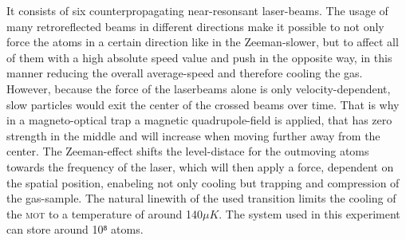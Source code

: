 It consists of six counterpropagating near-resonsant laser-beams. The usage of many retroreflected beams in different directions make it possible to not only force the atoms in a certain direction like in the Zeeman-slower, but to affect all of them with a high absolute speed value and push in the opposite way, in this manner reducing the overall average-speed and therefore cooling the gas. However, because the force of the laserbeams alone is only velocity-dependent, slow particles would exit the center of the crossed beams over time. That is why in a magneto-optical trap a magnetic quadrupole-field is applied, that has zero strength in the middle and will increase when moving further away from the center. The Zeeman-effect shifts the level-distace for the outmoving atoms towards the frequency of the laser, which will then apply a force, dependent on the spatial position, enabeling not only cooling but trapping and compression of the gas-sample. The natural linewith of the used transition limits the cooling of the \textsc{mot} to a temperature of around 140$\unit{\mu K}$. The system used in this experiment can store around 10⁸ atoms. 

